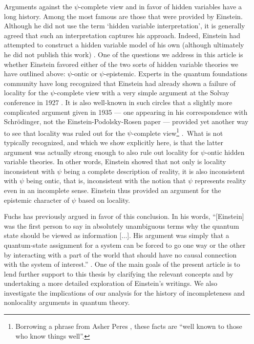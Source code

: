 \documentclass[aps,nofootinbib,12pt]{revtex4-2}
\begin{document}
Arguments against the $\psi$-complete view and in favor of hidden
variables have a long history. Among the most famous are those that
were provided by Einstein. Although he did not use the term `hidden
variable interpretation', it is generally agreed that such an
interpretation captures his approach. Indeed, Einstein had attempted
to construct a hidden variable model of his own (although ultimately
he did not publish this work)
\cite{Howard_eghost,bac_valentini_Epilotwave}. One of the questions
we address in this article is whether Einstein favored either of the
two sorts of hidden variable theories we have outlined above:
$\psi$-ontic or $\psi$-epistemic. Experts in the quantum foundations
community have long recognized that Einstein had already shown a
failure of locality for the $\psi$-complete view with a very simple
argument at the Solvay conference in 1927 \cite{bac_valentini}. It
is also well-known in such circles that a slightly more complicated
argument given in 1935 --- one appearing in his correspondence with
Schr\"{o}dinger, not the Einstein-Podolsky-Rosen paper --- provided
yet another way to see that locality was ruled out for the
$\psi$-complete view\footnote{Borrowing a phrase from Asher Peres
\cite{Peres_noclone}, these facts are ``well known to those who know
things well''.} \cite{Howard_einst_short,FineEcritique}.\ What is
not typically recognized, and which we show explicitly here, is that
the latter argument was actually strong enough to also rule out
locality for $\psi$-ontic hidden variable theories. In other words,
Einstein showed that not only is locality inconsistent with $\psi$
being a complete description of reality, it is also inconsistent
with $\psi$ being ontic, that is, inconsistent with the notion that
$\psi$ represents reality even in an incomplete sense. Einstein thus
provided an argument for the epistemic character of $\psi$ based on
locality.

Fuchs has previously argued in favor of this conclusion. In his
words, ``[Einstein] was the first person to say in absolutely
unambiguous terms why the quantum state should be viewed as
information [...]. His argument was simply that a quantum-state
assignment for a system can be forced to go one way or the other by
interacting with a part of the world that should have no causal
connection with the system of interest.'' \cite{Fuchs_Eepistemic}.
One of the main goals of the present article is to lend further
support to this thesis by clarifying the relevant concepts and by
undertaking a more detailed exploration of Einstein's writings. We
also investigate the implications of our analysis for the history of
incompleteness and nonlocality arguments in quantum theory.
\end{document}
